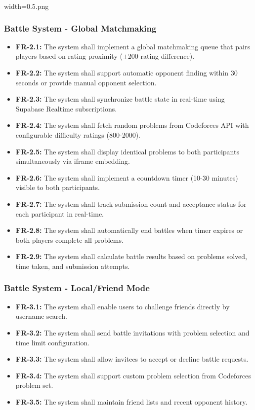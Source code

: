 width=0.5\linewidthimage.png\documentclass[12pt,a4paper]{article}
\begin{document}
\subsubsection{Battle System - Global Matchmaking}
\begin{itemize}
\item \textbf{FR-2.1:} The system shall implement a global matchmaking queue that pairs players based on rating proximity ($\pm$200 rating difference).
\item \textbf{FR-2.2:} The system shall support automatic opponent finding within 30 seconds or provide manual opponent selection.
\item \textbf{FR-2.3:} The system shall synchronize battle state in real-time using Supabase Realtime subscriptions.
\item \textbf{FR-2.4:} The system shall fetch random problems from Codeforces API with configurable difficulty ratings (800-2000).
\item \textbf{FR-2.5:} The system shall display identical problems to both participants simultaneously via iframe embedding.
\item \textbf{FR-2.6:} The system shall implement a countdown timer (10-30 minutes) visible to both participants.
\item \textbf{FR-2.7:} The system shall track submission count and acceptance status for each participant in real-time.
\item \textbf{FR-2.8:} The system shall automatically end battles when timer expires or both players complete all problems.
\item \textbf{FR-2.9:} The system shall calculate battle results based on problems solved, time taken, and submission attempts.
\end{itemize}

\subsubsection{Battle System - Local/Friend Mode}
\begin{itemize}
\item \textbf{FR-3.1:} The system shall enable users to challenge friends directly by username search.
\item \textbf{FR-3.2:} The system shall send battle invitations with problem selection and time limit configuration.
\item \textbf{FR-3.3:} The system shall allow invitees to accept or decline battle requests.
\item \textbf{FR-3.4:} The system shall support custom problem selection from Codeforces problem set.
\item \textbf{FR-3.5:} The system shall maintain friend lists and recent opponent history.
\end{itemize}
\end{document}

